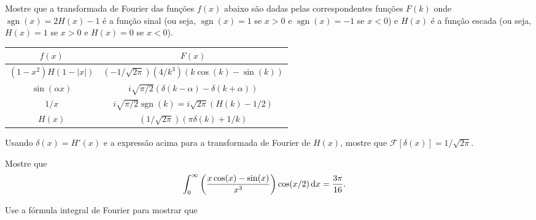 \documentclass[a4paper,12pt, leqno, answers]{exam}
\DeclareMathOperator{\sgn}{sgn}
\begin{document}
\thispagestyle{empty}

\newpage
\setcounter{page}{1}
\begin{questions}
    \question Mostre que a transformada de Fourier das funções $f(x)$
    abaixo são dadas pelas correspondentes funções $F(k)$ onde
    $\sgn(x) = 2 H(x) - 1$ é a função sinal (ou seja, $\sgn(x) = 1$
    se $x > 0$ e $\sgn(x) = -1$ se $x < 0$) e $H(x)$ é a função
    escada (ou seja, $H(x) = 1$ se $x > 0$ e $H(x) = 0$ se $x < 0$).
    \begin{center}
        \begin{tabular}{|c|c|}
            \hline
            $f(x)$ & $F(x)$ \\ \hline
            $(1 - x^2) H(1 - |x|)$ & $\left( -1 / \sqrt{2 \pi} \right) \left(
            4 / k^3 \right) \left( k \cos(k) - \sin(k) \right)$ \\ \hline
            $\sin\left( \alpha x \right)$ & $i \sqrt{\pi / 2} \left( \delta(k -
            \alpha) - \delta(k + \alpha) \right)$ \\ \hline
            $1 / x$ & $i \sqrt{\pi/2} \sgn(k) = i \sqrt{2 \pi} \left( H(k) - 1/2
            \right)$ \\ \hline
            $H(x)$ & $ \left( 1 / \sqrt{2 \pi} \right) \left( \pi \delta(k) + 1
            / k \right)$ \\ \hline
        \end{tabular}
    \end{center}
    \begin{solution}
    \end{solution}

    \question Usando $\delta(x) = H'(x)$ e a expressão acima para a
    transformada de Fourier de $H(x)$, mostre que $\mathcal{F}[\delta(x)] = 1 /
    \sqrt{2 \pi}$.
    \begin{solution}
    \end{solution}

    \question Mostre que
    \begin{align*}
        \int_0^\infty \left( \frac{x \cos(x) - \sin(x)}{x^3} \right) \cos(x/2)
        \, \mathrm{d}x &= \frac{3 \pi}{16}.
    \end{align*}
    \begin{solution}
    \end{solution}

    \question Use a f\'{o}rmula integral de Fourier para mostrar que
    \begin{parts}

\end{parts}
\end{questions}
\end{document}
